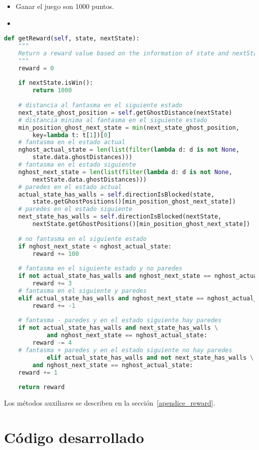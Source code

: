 \documentclass[11pt]{exam}
\begin{document}
\begin{itemize}
	\item Ganar el juego son 1000 puntos.
	\item 
\end{itemize}

\begin{lstlisting}[language=python, basicstyle=\footnotesize]
def getReward(self, state, nextState):
	"""
	Return a reward value based on the information of state and nextState
	"""
	reward = 0
	
	if nextState.isWin():
		return 1000
	
	# distancia al fantasma en el siguiente estado
	next_state_ghost_position = self.getGhostDistance(nextState)
	# distancia minima al fantasma en el siguiente estado
	min_position_ghost_next_state = min(next_state_ghost_position, 
		key=lambda t: t[1])[0]
	# fantasma en el estado actual
	nghost_actual_state = len(list(filter(lambda d: d is not None, 
		state.data.ghostDistances)))
	# fantasma en el estado siguiente
	nghost_next_state = len(list(filter(lambda d: d is not None, 
		nextState.data.ghostDistances)))
	# paredes en el estado actual
	actual_state_has_walls = self.directionIsBlocked(state, 
		state.getGhostPositions()[min_position_ghost_next_state])
	# paredes en el estado siguiente
	next_state_has_walls = self.directionIsBlocked(nextState, 
		nextState.getGhostPositions()[min_position_ghost_next_state])
	
	# no fantasma en el siguiente estado
	if nghost_next_state < nghost_actual_state:
		reward += 100
	
	# fantasma en el siguiente estado y no paredes
	if not actual_state_has_walls and nghost_next_state == nghost_actual_state:
		reward += 3
	# fantasma en el siguiente y paredes
	elif actual_state_has_walls and nghost_next_state == nghost_actual_state:
		reward += -1
	
	# fantasma - paredes y en el estado siguiente hay paredes
	if not actual_state_has_walls and next_state_has_walls \
			and nghost_next_state == nghost_actual_state:
		reward -= 4
	# fantasma + paredes y en el estado siguiente no hay paredes
			elif actual_state_has_walls and not next_state_has_walls \
		and nghost_next_state == nghost_actual_state:
	reward += 1
	
	return reward
\end{lstlisting}

Los métodos auxiliares se describen en la sección~\ref*{apendice_reward}.


\section{Código desarrollado}\label{codigo}
\end{document}
